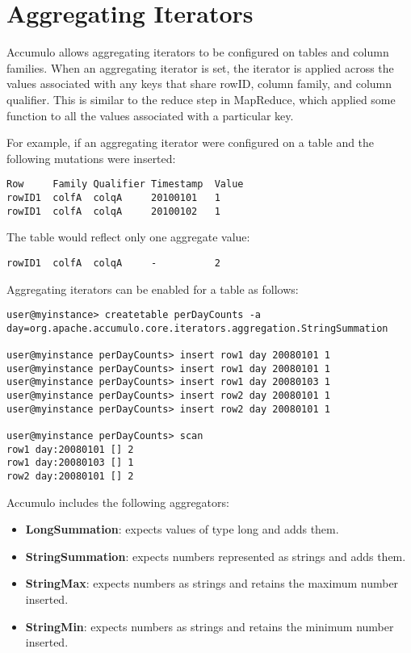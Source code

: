 \section{Aggregating Iterators}

Accumulo allows aggregating iterators to be configured on tables and column
families. When an aggregating iterator is set, the iterator is applied across the values
associated with any keys that share rowID, column family, and column qualifier.
This is similar to the reduce step in MapReduce, which applied some function to all
the values associated with a particular key.

For example, if an aggregating iterator were configured on a table and the following
mutations were inserted:

\small
\begin{verbatim}
Row     Family Qualifier Timestamp  Value
rowID1  colfA  colqA     20100101   1
rowID1  colfA  colqA     20100102   1
\end{verbatim}
\normalsize

The table would reflect only one aggregate value:

\small
\begin{verbatim}
rowID1  colfA  colqA     -          2
\end{verbatim}
\normalsize

Aggregating iterators can be enabled for a table as follows:

\small
\begin{verbatim}
user@myinstance> createtable perDayCounts -a
day=org.apache.accumulo.core.iterators.aggregation.StringSummation

user@myinstance perDayCounts> insert row1 day 20080101 1
user@myinstance perDayCounts> insert row1 day 20080101 1
user@myinstance perDayCounts> insert row1 day 20080103 1
user@myinstance perDayCounts> insert row2 day 20080101 1
user@myinstance perDayCounts> insert row2 day 20080101 1

user@myinstance perDayCounts> scan
row1 day:20080101 [] 2
row1 day:20080103 [] 1
row2 day:20080101 [] 2
\end{verbatim}
\normalsize

Accumulo includes the following aggregators:
\begin{itemize}
\item{\textbf{LongSummation}: expects values of type long and adds them.}
\item{\textbf{StringSummation}: expects numbers represented as strings and adds them.}
\item{\textbf{StringMax}: expects numbers as strings and retains the maximum number inserted.}
\item{\textbf{StringMin}: expects numbers as strings and retains the minimum number inserted.}
\end{itemize}

